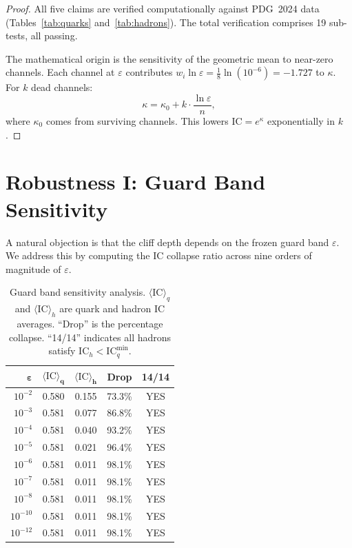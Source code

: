 \documentclass[
  aps,
  prd,
  twocolumn,
  superscriptaddress,
  nofootinbib,
  floatfix
]{revtex4-2}
\newcommand{\eps}{\varepsilon}
\newcommand{\beq}{\begin{equation}}
\newcommand{\eeq}{\end{equation}}
\newcommand{\IC}{\mathrm{IC}}
\begin{document}
\begin{proof}
All five claims are verified computationally against PDG~2024
data~\cite{pdg2024} (Tables~\ref{tab:quarks}
and~\ref{tab:hadrons}).  The total verification comprises 19
sub-tests, all passing.

The mathematical origin is the sensitivity of the geometric mean
to near-zero channels.  Each channel at $\eps$ contributes
$w_i \ln \eps = \frac{1}{8}\ln(10^{-6}) = -1.727$ to $\kappa$.
For $k$ dead channels:
\beq\label{eq:kappa_dead}
  \kappa = \kappa_0 + k \cdot \frac{\ln \eps}{n},
\eeq
where $\kappa_0$ comes from surviving channels.  This lowers
$\IC = e^{\kappa}$ exponentially in $k$.
\end{proof}


\section{Robustness I: Guard Band Sensitivity}\label{sec:epsilon}

A natural objection is that the cliff depth depends on the
frozen guard band $\eps$.  We address this by computing the
IC collapse ratio across nine orders of magnitude of $\eps$.

\begin{table}[H]
\caption{Guard band sensitivity analysis.
$\langle\IC\rangle_q$ and $\langle\IC\rangle_h$ are quark and
hadron IC averages.  ``Drop'' is the percentage collapse.
``14/14'' indicates all hadrons satisfy
$\IC_h < \IC_q^{\min}$.}
\label{tab:epsilon}
\centering\small
\begin{tabular}{@{}rcccc@{}}
\toprule
$\bm{\eps}$ & $\bm{\langle\IC\rangle_q}$ &
  $\bm{\langle\IC\rangle_h}$ &
  \textbf{Drop} & \textbf{14/14} \\
\midrule
$10^{-2}$  & 0.580 & 0.155 & 73.3\% & \textcolor{WeldGreen}{YES} \\
$10^{-3}$  & 0.581 & 0.077 & 86.8\% & \textcolor{WeldGreen}{YES} \\
$10^{-4}$  & 0.581 & 0.040 & 93.2\% & \textcolor{WeldGreen}{YES} \\
$10^{-5}$  & 0.581 & 0.021 & 96.4\% & \textcolor{WeldGreen}{YES} \\
$10^{-6}$  & 0.581 & 0.011 & 98.1\% & \textcolor{WeldGreen}{YES} \\
$10^{-7}$  & 0.581 & 0.011 & 98.1\% & \textcolor{WeldGreen}{YES} \\
$10^{-8}$  & 0.581 & 0.011 & 98.1\% & \textcolor{WeldGreen}{YES} \\
$10^{-10}$ & 0.581 & 0.011 & 98.1\% & \textcolor{WeldGreen}{YES} \\
$10^{-12}$ & 0.581 & 0.011 & 98.1\% & \textcolor{WeldGreen}{YES} \\
\bottomrule
\end{tabular}
\end{table}
\end{document}
